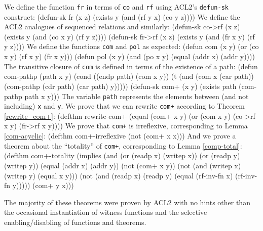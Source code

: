 \documentclass[]{eptcs}
\newenvironment{qv}
{\quote\Verbatim}
{\endVerbatim\endquote}
\begin{document}
We define the function \verb|fr| in terms of \verb|co| and \verb|rf| using ACL2's \verb|defun-sk| construct:
\begin{qv}
(defun-sk fr (x z)
  (exists y
    (and (rf y x) (co y z))))
\end{qv}
We define the ACL2 analogues of sequenced relations  and  similarly:
\begin{qv}
(defun-sk co->rf (x z)
  (exists y
    (and (co x y) (rf y z))))
(defun-sk fr->rf (x z)
  (exists y
    (and (fr x y) (rf y z))))
\end{qv}
We define the functions \verb|com| and \verb|pol| as expected:
\begin{qv}
(defun com (x y)
  (or (co x y)
      (rf x y)
      (fr x y)))
(defun pol (x y)
  (and (po x y)
       (equal (addr x) (addr y))))
\end{qv}
The transitive closure of \verb|com| is defined in terms of the existence of a path:
\begin{qv}
(defun com-pathp (path x y)
  (cond ((endp path) (com x y))
        (t (and (com x (car path))
                (com-pathp (cdr path) (car path) y)))))
(defun-sk com+ (x y)
  (exists path (com-pathp path x y)))
\end{qv}
The variable \verb|path| represents the elements between (and not including) \verb|x| and \verb|y|. We prove that we can rewrite \verb|com+| according to Theorem \ref{rewrite_com+}:
\begin{qv}
(defthm rewrite-com+
  (equal (com+ x y)
         (or (com x y)
             (co->rf x y)
             (fr->rf x y))))
\end{qv}
We prove that \verb|com+| is irreflexive, corresponding to Lemma \ref{com-acyclic}:
\begin{qv}
(defthm com+-irreflexive
  (not (com+ x x)))
\end{qv}
And we prove a theorem about the ``totality'' of \verb|com+|, corresponding to Lemma \ref{comp-total}:
\begin{qv}
(defthm com+-totality
  (implies (and (or (readp x) (writep x))
                (or (readp y) (writep y))
                (equal (addr x) (addr y))
                (not (com+ x y))
                (not (and (writep x)
                          (writep y)
                          (equal x y)))
                (not (and (readp x)
                          (readp y)
                          (equal (rf-inv-fn x) (rf-inv-fn y)))))
           (com+ y x)))
\end{qv}

The majority of these theorems were proven by ACL2 with no hints other than the occasional instantiation of witness functions and the selective enabling/disabling of functions and theorems.
\end{document}
